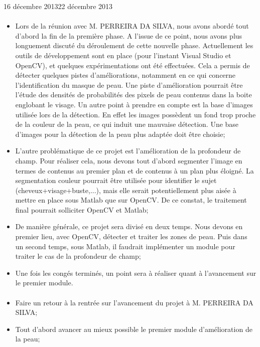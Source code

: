 \documentclass[11pt, french]{report-rd-info}
\begin{document}
\begin{fichesuivi}{16 décembre 2013}{22 décembre 2013}
\paragraph{}
	\begin{echange}
		\begin{itemize}
			\item Lors de la réunion avec M. PERREIRA DA SILVA, nous avons abordé tout d'abord la fin de la première phase. A l'issue de ce point, nous avons plus longuement discuté du déroulement de cette nouvelle phase. Actuellement les outils de développement sont en place (pour l'instant Visual Studio et OpenCV), et quelques expérimentations ont été effectuées. Cela a permis de détecter quelques pistes d'améliorations, notamment en ce qui concerne l'identification du masque de peau. Une piste d'amélioration pourrait être l'étude des densités de probabilités des pixels de peau contenus dans la boite englobant le visage. Un autre point à prendre en compte est la base d'images utilisée lors de la détection. En effet les images possèdent un fond trop proche de la couleur de la peau, ce qui induit une mauvaise détection. Une base d'images pour la détection de la peau plus adaptée doit être choisie;
			\item L'autre problématique de ce projet est l'amélioration de la profondeur de champ. Pour réaliser cela, nous devons tout d'abord segmenter l'image en termes de contenus au premier plan et de contenus à un plan plus éloigné. La segmentation couleur pourrait être utilisée pour identifier le sujet (cheveux+visage+buste,...), mais elle serait potentiellement plus aisée à mettre en place sous Matlab que sur OpenCV. De ce constat, le traitement final pourrait solliciter OpenCV et Matlab;
			\item De manière générale, ce projet sera divisé en deux temps. Nous devons en premier lieu, avec OpenCV, détecter et traiter les zones de peau. Puis dans un second temps, sous Matlab, il faudrait implémenter un module pour traiter le cas de la profondeur de champ;
			\item Une fois les congés terminés, un point sera à réaliser quant à l'avancement sur le premier module. 
		\end{itemize}
	\end{echange}

\paragraph*{}
	\begin{planification}
		\begin{itemize}
			\item Faire un retour à la rentrée sur l'avancement du projet à M. PERREIRA DA SILVA;
			\item Tout d'abord avancer au mieux possible le premier module d'amélioration de la peau;
		\end{itemize}
	\end{planification}
\end{fichesuivi}
\end{document}
